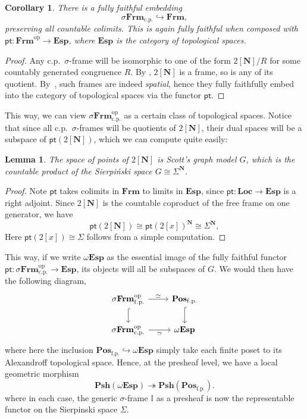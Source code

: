 \documentclass[12pt]{amsart}
\newtheorem{lemma}[theorem]{Lemma}
\newtheorem{corollary}[theorem]{Corollary}
\theoremstyle{definition}
\newcommand{\mb}[1]{\mathbf{#1}}
\newcommand{\mbb}[1]{\mathbb{#1}}
\newcommand{\I}{\mbb I}
\newcommand{\mr}[1]{\mathrm{#1}}
\newcommand{\ms}[1]{\mathsf{#1}}
\newcommand{\Pos}{\mb{Pos}}
\newcommand{\psh}{\mb{Psh}}
\newcommand{\op}{^{\mathrm{op}}}
\newcommand{\surj}{\twoheadrightarrow}
\newcommand{\hook}{\hookrightarrow}
\newcommand{\fp}{_{\mr{f.p.}}}
\newcommand{\cp}{_{\mr{c.p.}}}
\newcommand{\N}{\mb N}
\newcommand{\pt}{\ms{pt}}
\newcommand{\sFrm}{\sigma\mb{Frm}}
\newcommand{\Frm}{\mb{Frm}}
\newcommand{\Loc}{\mb{Loc}}
\newcommand{\Topp}{\mb{Esp}}
\newcommand{\wTop}{\omega\mb{Esp}}
\begin{document}

\begin{corollary}\label{cor:dualsframe}
  There is a fully faithful embedding
  \[ \sFrm\cp \hook \Frm, \]
  preserving all countable colimits. This is again fully faithful when composed with $\ms{pt} : \Frm\op \to \Topp$, where $\Topp$ is the category of topological spaces.
\end{corollary}
\begin{proof}
  Any c.p.\ $\sigma$-frame will be isomorphic to one of the form $2[\N]/R$ for some countably generated congruence $R$. By , $2[\N]$ is a frame, so is any of its quotient. By~\cite[Thm. 6.2.4]{makkai2006first}, such frames are indeed \emph{spatial}, hence they fully faithfully embed into the category of topological spaces via the functor $\pt$.
\end{proof}

This way, we can view $\sFrm\cp\op$ as a certain class of topological spaces. Notice that since all c.p.\ $\sigma$-frames will be quotients of $2[\N]$, their dual spaces will be a subspace of $\pt(2[\N])$, which we can compute quite easily:

\begin{lemma}
  The space of points of $2[\N]$ is Scott's graph model $G$, which is the countable product of the Sierpi\'nski space $G \cong \Sigma^\N$.
\end{lemma}
\begin{proof}
  Note $\pt$ takes colimits in $\Frm$ to limits in $\Topp$, since $\pt \colon \Loc \to \Topp$ is a right adjoint. Since $2[\N]$ is the countable coproduct of the free frame on one generator, we have
  \[ \pt(2[\N]) \cong \pt(2[x])^\N \cong \Sigma^\N, \]
  Here $\pt(2[x]) \cong \Sigma$ follows from a simple computation.
\end{proof}

This way, if we write $\wTop$ as the essential image of the fully faithful functor $\pt \colon \sFrm\cp\op \to \Topp$, its objects will all be subspaces of $G$. We would then have the following diagram,
\[
\begin{tikzcd}
  \sFrm\fp\op \ar[d, hook] \ar[r, "\simeq"] & \Pos\fp \ar[d, hook] \\
  \sFrm\cp\op \ar[r, "\simeq"'] & \wTop
\end{tikzcd}
\]
where here the inclusion $\Pos\fp \hook \wTop$ simply take each finite poset to its Alexandroff topological space. Hence, at the presheaf level, we have a local geometric morphism
\[ \psh(\wTop) \surj \psh(\Pos\fp). \]
where in each case, the generic $\sigma$-frame $\I$ as a presheaf is now the representable functor on the Sierpinski space $\Sigma$. 
\end{document}
